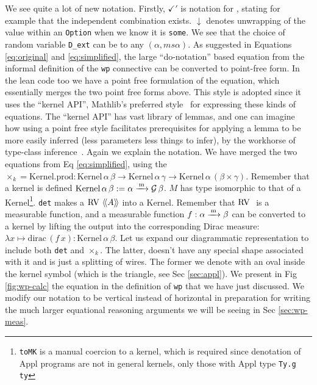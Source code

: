 We see quite a lot of new notation. Firstly, $\checkmark'$ is notation for , stating for example that the independent combination  exists.
$\downarrow$ denotes unwrapping of the value within an \texttt{Option} when we know it is \texttt{some}. We see that the choice of random variable \texttt{D\_ext} can be to any $(\alpha, ms\alpha)$.
As suggested in Equations \ref{eq:original} and \ref{eq:simplified}, the large ``do-notation'' based equation from the informal definition of the \texttt{wp} connective can
be converted to point-free form.
In the lean code too we have a point free formulation of the equation, which essentially merges the two point free forms above. This style is adopted since it uses the
``kernel API'', Mathlib's preferred style~\citep{remy} for expressing these kinds of equations. The ``kernel API'' has vast library of lemmas, and one can imagine
how using a point free style facilitates prerequisites for applying a lemma to be more easily inferred (less parameters less things to infer), by the workhorse of type-class inference~\citep{spitters}.
Again we explain the notation. We have merged the two equations from Eq \ref{eq:simplified}, using the
$\times_k = \text{Kernel.prod} : \mathrm{Kernel}\, \alpha\, \beta \to \mathrm{Kernel}\, \alpha\, \gamma \to \mathrm{Kernel}\, \alpha\, (\beta \times \gamma)$. Remember that a kernel is defined $\mathrm{Kernel}\, \alpha\, \beta := \alpha \xrightarrow{\,\mathrm{m}\,} \mathcal{G}\, \beta$.
$M$ has type isomorphic to that of a Kernel\footnote{\texttt{toMK} is a manual coercion to a kernel, which is required since denotation of Appl programs are not in general kernels, only those with Appl type \texttt{Ty.g ty}}.
\texttt{det} makes a $\mathrm{RV\ } \langle\!\langle A \rangle\!\rangle$ into a Kernel. Remember that $\mathrm{RV\ }$ is a measurable function, and a measurable function $f: \alpha \xrightarrow{\,\mathrm{m}\,} \beta$ can be converted
to a kernel by lifting the output into the corresponding Dirac measure: 
$\lambda x \mapsto \mathrm{dirac}\, (f\, x) : \mathrm{Kernel}\, \alpha\, \beta$. Let us expand our diagrammatic representation to include both \texttt{det} and $\times_k$.
The latter, doesn't have any special shape associated with it and is just a splitting of wires. The former we denote with an oval inside the kernel symbol (which is the triangle, see Sec \ref{sec:appl}).
We present in Fig \ref{fig:wp-calc} the equation in the definition of \texttt{wp} that we have just discussed.
We modify our notation to be vertical instead of horizontal in preparation for writing the much larger equational reasoning arguments we will be seeing in Sec \ref{sec:wp-meas}.

